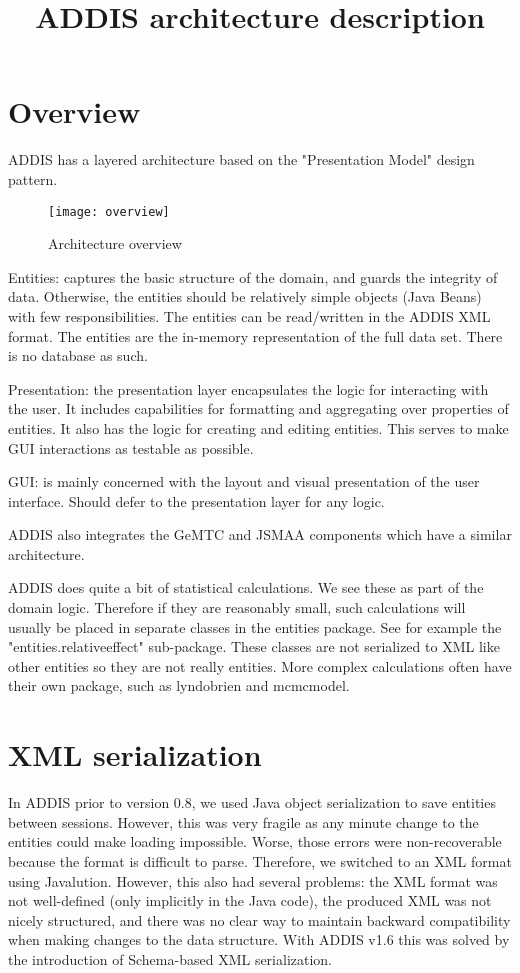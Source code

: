 \documentclass[a4paper]{article}
\title{ADDIS architecture description}
\begin{document}
\maketitle

\section{Overview}

ADDIS has a layered architecture based on the "Presentation Model" design pattern.

\begin{figure}[h]
\centering
\texttt{[image: overview]}
\caption{Architecture overview}
\end{figure}

Entities: captures the basic structure of the domain, and guards the integrity of data.
Otherwise, the entities should be relatively simple objects (Java Beans) with few responsibilities.
The entities can be read/written in the ADDIS XML format.
The entities are the in-memory representation of the full data set.
There is no database as such.

Presentation: the presentation layer encapsulates the logic for interacting with the user.
It includes capabilities for formatting and aggregating over properties of entities.
It also has the logic for creating and editing entities.
This serves to make GUI interactions as testable as possible.

GUI: is mainly concerned with the layout and visual presentation of the user interface.
Should defer to the presentation layer for any logic.

ADDIS also integrates the GeMTC and JSMAA components which have a similar architecture.

ADDIS does quite a bit of statistical calculations.
We see these as part of the domain logic.
Therefore if they are reasonably small, such calculations will usually be placed in separate classes in the entities package.
See for example the "entities.relativeeffect" sub-package.
These classes are not serialized to XML like other entities so they are not really entities.
More complex calculations often have their own package, such as lyndobrien and mcmcmodel.

\section{XML serialization}

In ADDIS prior to version 0.8, we used Java object serialization to save entities between sessions.
However, this was very fragile as any minute change to the entities could make loading impossible.
Worse, those errors were non-recoverable because the format is difficult to parse.
Therefore, we switched to an XML format using Javalution.
However, this also had several problems: the XML format was not well-defined (only implicitly in the Java code), the produced XML was not nicely structured, and there was no clear way to maintain backward compatibility when making changes to the data structure.
With ADDIS v1.6 this was solved by the introduction of Schema-based XML serialization.
\end{document}
